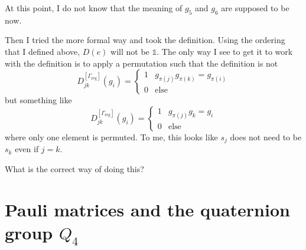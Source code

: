 \documentclass[11pt, english, fleqn, DIV=15, headinclude, BCOR=1cm]{scrartcl}
\begin{document}
\begin{question}
    At this point, I do not know that the meaning of $g_5$ and $g_6$ are
    supposed to be now.

    Then I tried the more formal way and took the definition. Using the
    ordering that I defined above, $D(e)$ will not be $\mathbb 1$. The only way
    I see to get it to work with the definition is to apply a permutation such
    that the definition is not
    \[
        D_{jk}^{[\Gamma_\text{reg}]} (g_i) =
        \begin{cases}
            1 & g_{\pi(j)} g_{\pi(k)} = g_{\pi(i)} \\
            0 & \text{else}
        \end{cases}
    \]
    but something like
    \[
        D_{jk}^{[\Gamma_\text{reg}]} (g_i) =
        \begin{cases}
            1 & g_{\pi(j)} g_{k} = g_{i} \\
            0 & \text{else}
        \end{cases}
    \]
    where only one element is permuted. To me, this looks like $s_j$ does not
    need to be $s_k$ even if $j = k$.

    What is the correct way of doing this?
\end{question}

\section{Pauli matrices and the quaternion group $Q_4$}
\end{document}
